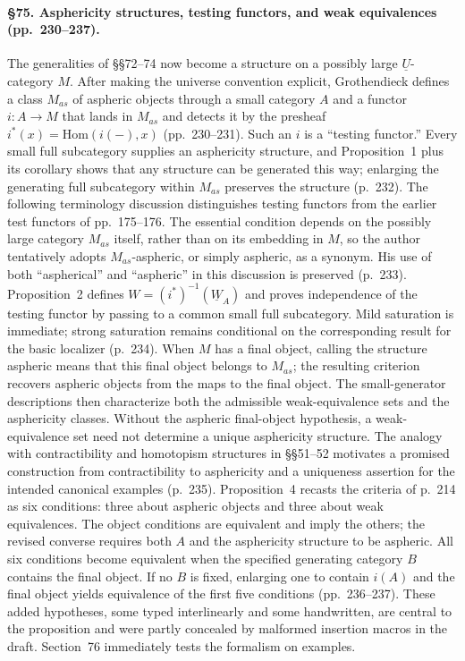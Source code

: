 \paragraph{\S75. Asphericity structures, testing functors, and weak equivalences (pp.\ 230--237).}
The generalities of \S\S72--74 now become a structure on a possibly large $\underline U$-category $M$. After making the universe convention explicit, Grothendieck defines a class $M_{as}$ of aspheric objects through a small category $A$ and a functor $i:A\to M$ that lands in $M_{as}$ and detects it by the presheaf $i^*(x)=\mathrm{Hom}(i(-),x)$ (pp.\ 230--231). Such an $i$ is a “testing functor.” Every small full subcategory supplies an asphericity structure, and Proposition~1 plus its corollary shows that any structure can be generated this way; enlarging the generating full subcategory within $M_{as}$ preserves the structure (p.\ 232). The following terminology discussion distinguishes testing functors from the earlier test functors of pp.\ 175--176. The essential condition depends on the possibly large category $M_{as}$ itself, rather than on its embedding in $M$, so the author tentatively adopts $M_{as}$-aspheric, or simply aspheric, as a synonym. His use of both “aspherical” and “aspheric” in this discussion is preserved (p.\ 233).
Proposition~2 defines $W=(i^*)^{-1}(\underline W_A)$ and proves independence of the testing functor by passing to a common small full subcategory. Mild saturation is immediate; strong saturation remains conditional on the corresponding result for the basic localizer (p.\ 234). When $M$ has a final object, calling the structure aspheric means that this final object belongs to $M_{as}$; the resulting criterion recovers aspheric objects from the maps to the final object. The small-generator descriptions then characterize both the admissible weak-equivalence sets and the asphericity classes. Without the aspheric final-object hypothesis, a weak-equivalence set need not determine a unique asphericity structure. The analogy with contractibility and homotopism structures in \S\S51--52 motivates a promised construction from contractibility to asphericity and a uniqueness assertion for the intended canonical examples (p.\ 235). Proposition~4 recasts the criteria of p.\ 214 as six conditions: three about aspheric objects and three about weak equivalences. The object conditions are equivalent and imply the others; the revised converse requires both $A$ and the asphericity structure to be aspheric. All six conditions become equivalent when the specified generating category $B$ contains the final object. If no $B$ is fixed, enlarging one to contain $i(A)$ and the final object yields equivalence of the first five conditions (pp.\ 236--237). These added hypotheses, some typed interlinearly and some handwritten, are central to the proposition and were partly concealed by malformed insertion macros in the draft. Section~76 immediately tests the formalism on examples.
